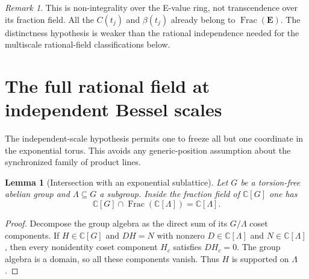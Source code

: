 \documentclass[11pt]{article}
\newtheorem{lemma}[theorem]{Lemma}
\theoremstyle{definition}
\theoremstyle{remark}
\newtheorem{remark}[theorem]{Remark}
\newcommand{\Qa}{\overline{\mathbb Q}}
\newcommand{\E}{\mathbf E}
\newcommand{\Ebar}{\overline{\mathbf E}}
\begin{document}
\begin{remark}
This is non-integrality over the E-value ring, not transcendence over its
fraction field. All the $C(t_j)$ and $\beta(t_j)$ already belong to
$\operatorname{Frac}(\E)$. The distinctness hypothesis is weaker than the rational independence
needed for the multiscale rational-field classifications below.
\end{remark}




\section{The full rational field at independent Bessel scales}

The independent-scale hypothesis permits one to freeze all but one
coordinate in the exponential torus. This avoids any generic-position
assumption about the synchronized family of product lines.

\begin{lemma}[Intersection with an exponential sublattice]
\label{mbmulti:cosets}
Let $G$ be a torsion-free abelian group and $\Lambda\subseteq G$ a
subgroup. Inside the fraction field of $\mathbb C[G]$ one has
\[
 \mathbb C[G]\cap\operatorname{Frac}(\mathbb C[\Lambda])
       =\mathbb C[\Lambda].
\]
\end{lemma}
\begin{proof}
Decompose the group algebra as the direct sum of its $G/\Lambda$
coset components. If $H\in\mathbb C[G]$ and $DH=N$ with nonzero
$D\in\mathbb C[\Lambda]$ and $N\in\mathbb C[\Lambda]$, then every
nonidentity coset component $H_c$ satisfies $DH_c=0$. The group algebra
is a domain, so all these components vanish. Thus $H$ is supported on
$\Lambda$.
\end{proof}
\end{document}
